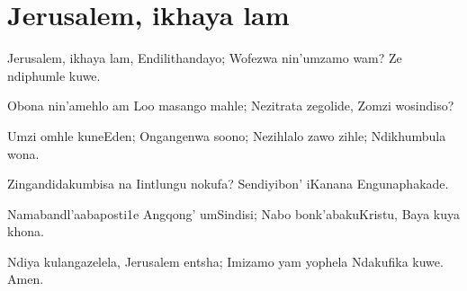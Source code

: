 \starttocol
\chapter{Jerusalem, ikhaya lam}
\nexttocol
\hfill{\it }
\stoptocol
\starttocol
\startlines
{\sc Jerusalem}, ikhaya lam, 
Endilithandayo; 
Wofezwa nin'umzamo wam?
Ze ndiphumle kuwe.

Obona nin'amehlo am
Loo masango mahle;
Nezitrata zegolide,
Zomzi wosindiso?

Umzi omhle kuneEden;
Ongangenwa soono;
Nezihlalo zawo zihle; 
Ndikhumbula wona.

Zingandidakumbisa na
Iintlungu nokufa?
Sendiyibon' iKanana
Engunaphakade.

Namabandl'aabaposti1e
Angqong' umSindisi;
Nabo bonk'abakuKristu,
Baya kuya khona.

Ndiya kulangazelela,
Jerusalem entsha;
Imizamo yam yophela
Ndakufika kuwe. 
\hfill Amen.


\stoplines
\nexttocol

\stoptocol
